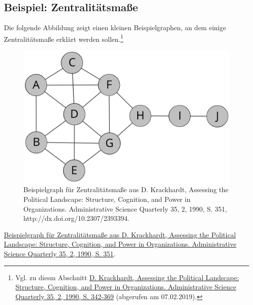 \documentclass[ngerman,]{scrreprt}
\begin{document}
\subsection{Beispiel: Zentralitätsmaße}\label{beispiel-zentralituxe4tsmauxdfe}

Die folgende Abbildung zeigt einen kleinen Beispielgraphen, an dem einige Zentralitätsmaße erklärt werden sollen.\footnote{Vgl. zu diesm Abschnitt \href{https://www.jstor.org/stable/2393394?origin=crossref\&seq=1\#metadata_info_tab_contents}{D. Krackhardt, Assessing the Political Landscape: Structure, Cognition, and Power in Organizations. Administrative Science Quarterly 35, 2, 1990, S. 342-369} (abgerufen am 07.02.2019).}

\begin{figure}
\centering
\includegraphics{Bilder/krackhardtKite.png}
\caption{Beispielgraph für Zentralitätsmaße aus D. Krackhardt, Assessing the Political Landscape: Structure, Cognition, and Power in Organizations. Administrative Science Quarterly 35, 2, 1990, S. 351, http://dx.doi.org/10.2307/2393394.}
\end{figure}

\href{http://dx.doi.org/10.2307/2393394}{Beispielgraph für Zentralitätsmaße aus D. Krackhardt, Assessing the Political Landscape: Structure, Cognition, and Power in Organizations. Administrative Science Quarterly 35, 2, 1990, S. 351}.
\end{document}
